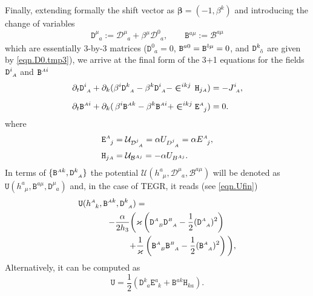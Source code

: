 \documentclass[
10pt, %
a4paper, %
oneside, %
twocolumn,
headinclude,footinclude, %
BCOR5mm, %
]{scrartcl}
\newcommand{\sA}{\mathsmaller A}
\newcommand{\sB}{\mathsmaller B}
\newcommand{\pd}[1]{\partial_{#1}}
\newcommand{\tetrsymbol}{h}
\newcommand{\tetr}[2]{\tetrsymbol^{#1}_{\phantom{#1}#2}}
\newcommand{\detTetr}{\tetrsymbol}
\newcommand{\ET}[2]{E^{#1}_{\phantom{#1}#2}}	%
\newcommand{\Dm}[2]{D_{\phantom{#2}#1}^{#2}}	%
\newcommand{\aD}[2]{\mathcal{D}_{\phantom{#2}#1}^{#2}}	%
\newcommand{\Dfin}[2]{\mathtt{D}_{\phantom{#2}#1}^{#2}}	%
\newcommand{\Hfin}[2]{\mathtt{H}_{#2#1}}	%
\newcommand{\Efin}[2]{\mathtt{E}^{#1}_{\phantom{#1}#2}}	%
\newcommand{\Ufin}{\mathtt{U}}
\newcommand{\Bm}[2]{B^{#1#2}}	%
\newcommand{\aB}[2]{\mathcal{B}^{#1#2}}	%
\newcommand{\Bfin}[2]{\mathtt{B}^{#1#2}}	%
\newcommand{\Bfinmix}[2]{\mathtt{B}^{#1}_{\phantom{#1}#2}}	%
\newcommand{\Um}{U}%
\newcommand{\aU}{\mathcal{U}}%
\newcommand{\LCsymb}{\bm{\in}}    %
\newcommand{\NC}[2]{J^{#2}_{\phantom{#2}#1}}
\newcommand{\indalg}[1]{\hat{\mathsmaller{#1}}}
\newcommand{\shift}[1]{\beta^{#1}}
\begin{document}
	Finally, extending formally the shift vector as $ \bm{\beta}=(-1,\beta^{k}) 
	$ and introducing 
	the 
	change of variables
	\begin{equation}\label{eqn.varDB.final}
		\Dfin{a}{\mu} := \aD{a}{\mu} + \beta^{\mu} \aD{a}{0}, \qquad \Bfin{a}{\mu} := \aB{a}{\mu}
	\end{equation}
	which are essentially $ 3 $-by-$ 3 $ matrices ($ \Dfin{a}{0} = 0$, $ \Bfin{a}{0} = 
	\Bfin{\indalg{0}}{\mu} = 0 $, and $ \Dfin{\indalg{0}}{k} $ are given by \eqref{eqn.D0.tmp3}),
	we arrive at the final form of the 3+1 equations for the fields $ \Dfin{\sA}{i} $ and $ 
	\Bfin{\sA}{i} $
	\begin{subequations}\label{eqn.PDE.BD.final}
		\begin{align}
			\pd{t} \Dfin{\sA}{i} + \pd{k}(\shift{i} 
			\Dfin{\sA}{k} - \shift{k}\Dfin{\sA}{i}  - \LCsymb^{ikj} \,
			\Hfin{\sA}{j}) & 
			= -\NC{\sA}{i}, \label{eqn.tpo.D}\\[2mm]
			\pd{t} \Bfin{\sA}{i} + \pd{k}(\,\shift{i} 
			\Bfin{\sA}{k} - \shift{k}\Bfin{\sA}{i}  + \LCsymb^{ikj} 
			\Efin{\sA}{j}) & 
			= 0\label{eqn.tpo.B} .
		\end{align}
	\end{subequations}
	where
	\begin{subequations}
		\begin{align}\label{eqn.HE.fin}
			&\Efin{\sA}{j} = \aU_{\aD{\sA}{j}} = \alpha \Um_{\Dm{\sA}{j}}= \alpha \ET{\sA}{j},
			\\
			&\Hfin{\sA}{j} = \aU_{\aB{\sA}{j}} =-\alpha \Um_{\Bm{\sA}{j}}.
		\end{align}
	\end{subequations}
	In terms of $ \{\Bfin{\sA}{k},\Dfin{\sA}{k}\} $ the potential $  
	\aU(\tetr{a}{\mu},\aD{a}{\mu},\aB{a}{\mu}) $ will be denoted as 
	$
	\Ufin(\tetr{a}{\mu},\Bfin{a}{\mu},\Dfin{a}{\mu})  
	$ and, in the case of TEGR, it reads (see \eqref{eqn.Ufin})
	\begin{align}\label{eqn.Ufin0}
		\Ufin(\tetr{\sA}{k},\Bfin{\sA}{k},\Dfin{\sA}{k}) & =  \nonumber\\
		 -\frac{\alpha}{2\detTetr_3} \bigg( 
		& \varkappa \left( \Dfin{\sB}{\sA} \Dfin{\sA}{\sB} - \frac{1}{2} 
		(\Dfin{\sA}{\sA})^2\right) \nonumber\\
		 +
		&\frac{1}{\varkappa} \left( \Bfinmix{\sA}{\sB} \Bfinmix{\sB}{\sA} - \frac{1}{2} 
		(\Bfinmix{\sA}{\sA})^2
		\right)
		\bigg),
	\end{align}
	Alternatively, it can be computed as
	\begin{equation}\label{eqn.U.bdeh}
		\Ufin = \frac{1}{2} ( \Dfin{a}{k} \Efin{a}{k} + \Bfin{a}{k} \Hfin{a}{k} ).
	\end{equation} 
	
\end{document}
